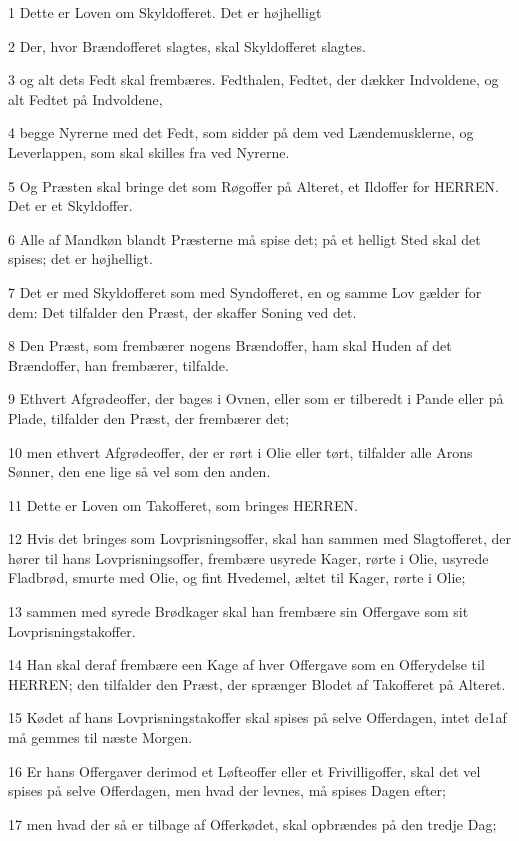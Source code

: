 \par 1 Dette er Loven om Skyldofferet. Det er højhelligt
\par 2 Der, hvor Brændofferet slagtes, skal Skyldofferet slagtes.
\par 3 og alt dets Fedt skal frembæres. Fedthalen, Fedtet, der dækker Indvoldene, og alt Fedtet på Indvoldene,
\par 4 begge Nyrerne med det Fedt, som sidder på dem ved Lændemusklerne, og Leverlappen, som skal skilles fra ved Nyrerne.
\par 5 Og Præsten skal bringe det som Røgoffer på Alteret, et Ildoffer for HERREN. Det er et Skyldoffer.
\par 6 Alle af Mandkøn blandt Præsterne må spise det; på et helligt Sted skal det spises; det er højhelligt.
\par 7 Det er med Skyldofferet som med Syndofferet, en og samme Lov gælder for dem: Det tilfalder den Præst, der skaffer Soning ved det.
\par 8 Den Præst, som frembærer nogens Brændoffer, ham skal Huden af det Brændoffer, han frembærer, tilfalde.
\par 9 Ethvert Afgrødeoffer, der bages i Ovnen, eller som er tilberedt i Pande eller på Plade, tilfalder den Præst, der frembærer det;
\par 10 men ethvert Afgrødeoffer, der er rørt i Olie eller tørt, tilfalder alle Arons Sønner, den ene lige så vel som den anden.
\par 11 Dette er Loven om Takofferet, som bringes HERREN.
\par 12 Hvis det bringes som Lovprisningsoffer, skal han sammen med Slagtofferet, der hører til hans Lovprisningsoffer, frembære usyrede Kager, rørte i Olie, usyrede Fladbrød, smurte med Olie, og fint Hvedemel, æltet til Kager, rørte i Olie;
\par 13 sammen med syrede Brødkager skal han frembære sin Offergave som sit Lovprisningstakoffer.
\par 14 Han skal deraf frembære een Kage af hver Offergave som en Offerydelse til HERREN; den tilfalder den Præst, der sprænger Blodet af Takofferet på Alteret.
\par 15 Kødet af hans Lovprisningstakoffer skal spises på selve Offerdagen, intet de1af må gemmes til næste Morgen.
\par 16 Er hans Offergaver derimod et Løfteoffer eller et Frivilligoffer, skal det vel spises på selve Offerdagen, men hvad der levnes, må spises Dagen efter;
\par 17 men hvad der så er tilbage af Offerkødet, skal opbrændes på den tredje Dag;
